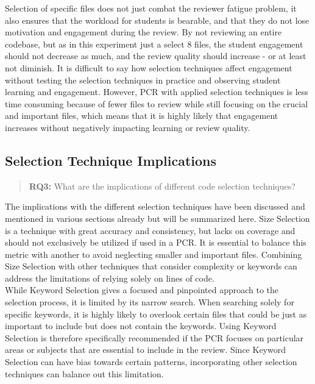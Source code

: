 Selection of specific files does not just combat the reviewer fatigue problem, it also ensures that the workload for students is bearable, and that they do not lose motivation and engagement during the review. By not reviewing an entire codebase, but as in this experiment just a select 8 files, the student engagement should not decrease as much, and the review quality should increase - or at least not diminish. It is difficult to say how selection techniques affect engagement without testing the selection techniques in practice and observing student learning and engagement. However, PCR with applied selection techniques is less time consuming because of fewer files to review while still focusing on the crucial and important files, which means that it is highly likely that engagement increases without negatively impacting learning or review quality. \\



\subsection{Selection Technique Implications}
\begin{quote}
    \textbf{RQ3:} What are the implications of different code selection techniques?
\end{quote}


The implications with the different selection techniques have been discussed and mentioned in various sections already but will be summarized here. Size Selection is a technique with great accuracy and consistency, but lacks on coverage and should not exclusively be utilized if used in a PCR. It is essential to balance this metric with another to avoid neglecting smaller and important files. Combining Size Selection with other techniques that consider complexity or keywords can address the limitations of relying solely on lines of code. \\

While Keyword Selection gives a focused and pinpointed approach to the selection process, it is limited by its narrow search. When searching solely for specific keywords, it is highly likely to overlook certain files that could be just as important to include but does not contain the keywords. Using Keyword Selection is therefore specifically recommended if the PCR focuses on particular areas or subjects that are essential to include in the review. Since Keyword Selection can have bias towards certain patterns, incorporating other selection techniques can balance out this limitation. \\

